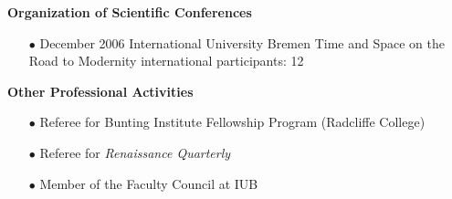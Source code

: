 \vspace{0.6cm}



\textbf{Organization of Scientific Conferences}\\[-0.25cm]
\begin{enumerate}
\item[$\bullet$]	December 2006\newline
International University Bremen\newline
Time and Space on the Road to Modernity\newline
international participants: 12
\end{enumerate}



\vspace{0.6cm}
\textbf{Other Professional Activities}\\[-0.25cm]
\begin{enumerate}
\item[$\bullet$] Referee for Bunting Institute Fellowship Program (Radcliffe College)
\item[$\bullet$] Referee for \textit{Renaissance Quarterly}
\item[$\bullet$] Member of the Faculty Council at IUB
\end{enumerate}


